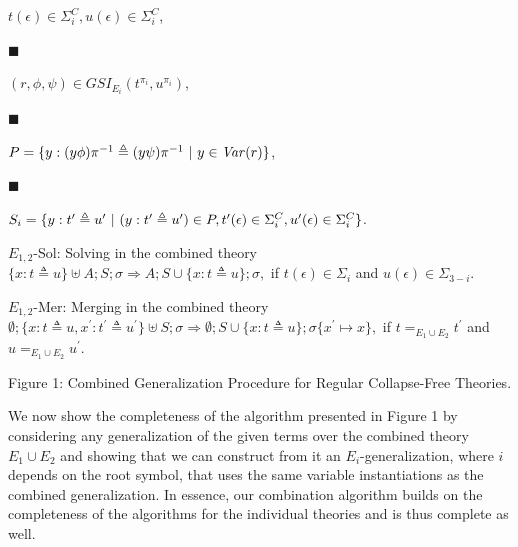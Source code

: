 $t(\epsilon)\in{\Sigma}^{C}_{i},u(\epsilon)\in{\Sigma}^{C}_{i}$,\par
 
 
 
\par\noindent  $\blacksquare$ 
 
$(r,\phi,\psi)\in GSI_{E_{i}}(t^{\pi_{i}},u^{\pi_{i}})$,\par
 
 
 
\par\noindent  $\blacksquare$ 
 
$P=\{y:(y\phi)\pi^{-1}\triangleq(y\psi)\pi^{-1}\leavevmode\nobreak\ |\leavevmode\nobreak\ y\in\mathit{Var}(r)\}$,\par
 
 
 
\par\noindent  $\blacksquare$ 
 
$S_{i}=\{y:t^{\prime}\triangleq u^{\prime}\leavevmode\nobreak\ |\leavevmode\nobreak\ (y:t^{\prime}\triangleq u^{\prime})\in P,t^{\prime}(\epsilon)\in{\Sigma}^{C}_{i},u^{\prime}(\epsilon)\in{\Sigma}^{C}_{i}\}$.\par
 
 
      
\par
 
$E_{1,2}$-Sol: Solving in the combined theory  $\{x:t\triangleq u\}\uplus A;S;\sigma\Longrightarrow A;S\cup\{x:t\triangleq u\};\sigma,$ if $t(\epsilon)\in\Sigma_{i}$ and $u(\epsilon)\in\Sigma_{3-i}$.\par
      
\par
 
$E_{1,2}$-Mer: Merging in the combined theory  $\emptyset;\{x:t\triangleq u,x^{\prime}:t^{\prime}\triangleq u^{\prime}\}\uplus
S;\sigma\Longrightarrow\emptyset;S\cup\{x:t\triangleq u\};\sigma\{x^{\prime}\mapsto x\},$ if $t=_{E_{1}\cup E_{2}}t^{\prime}$ and $u=_{E_{1}\cup E_{2}}u^{\prime}$.\par
    
Figure 1: Combined Generalization Procedure for Regular Collapse-Free Theories.\par
 
 
 
We now show the completeness of the algorithm presented in Figure 1 by considering any generalization of the given terms over the combined theory $E_{1}\cup E_{2}$ and showing that we can construct from it an $E_{i}$-generalization, where $i$ depends on the root symbol, that uses the same variable instantiations as the combined generalization. In essence, our combination algorithm builds on the completeness of the algorithms for the individual theories and is thus complete as well.\par
 
